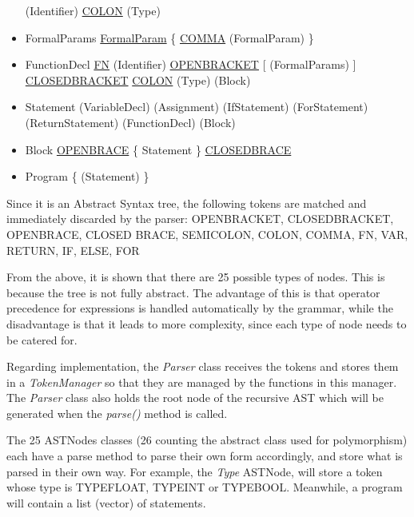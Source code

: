 \begin{itemize}
		\subitem (Identifier) \ul{COLON} (Type)
	\item FormalParams
		\subitem \ul{FormalParam} \{ \ul{COMMA} (FormalParam) \}
	\item FunctionDecl
		\subitem \ul{FN} (Identifier) \ul{OPEN\un BRACKET} [ (FormalParams) ] \ul{CLOSED\un BRACKET} \ul{COLON} (Type) (Block)
	\item Statement
		\subitem (VariableDecl)
		\subitem (Assignment)
		\subitem (IfStatement)
		\subitem (ForStatement)
		\subitem (ReturnStatement)
		\subitem (FunctionDecl)
		\subitem (Block)
	\item Block
		\subitem \ul{OPEN\un BRACE} \{ Statement \} \ul{CLOSED\un BRACE}
	\item Program
		\subitem \{ (Statement) \}
\end{itemize}

Since it is an Abstract Syntax tree, the following tokens are matched and immediately discarded by the parser: OPEN\un BRACKET, CLOSED\un BRACKET, OPEN\un BRACE, CLOSED \un BRACE, SEMI\un COLON, COLON, COMMA, FN, VAR, RETURN, IF, ELSE, FOR

From the above, it is shown that there are 25 possible types of nodes. This is because the tree is not fully abstract. The advantage of this is that operator precedence for expressions is handled automatically by the grammar, while the disadvantage is that it leads to more complexity, since each type of node needs to be catered for.

Regarding implementation, the \textit{Parser} class receives the tokens and stores them in a \textit{TokenManager} so that they are managed by the functions in this manager. The \textit{Parser} class also holds the root node of the recursive AST which will be generated when the \textit{parse()} method is called.

The 25 ASTNodes classes (26 counting the abstract class used for polymorphism) each have a parse method to parse their own form accordingly, and store what is parsed in their own way. For example, the \textit{Type} ASTNode, will store a token whose type is TYPE\un FLOAT, TYPE\un INT or TYPE\un BOOL. Meanwhile, a program will contain a list (vector) of statements.

